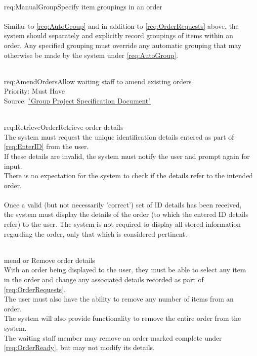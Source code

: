 \documentclass[11pt, a4paper]{report}
\def\itempar#1\\{\item \textbf{#1}\\} %
\begin{document}
\begin{enumerate}[label=F-UR-\arabic*, series=functional]
\begin{enumerate}[label*=.\arabic*]
\itempar \label{req:ManualGroup}Specify item groupings in an order\\
\underline{}\\
Similar to \autoref{req:AutoGroup} and in addition to \autoref{req:OrderRequests} above, the system should separately and explicitly record groupings of items within an order. Any specified grouping must override any automatic grouping that may otherwise be made by the system under \autoref{req:AutoGroup}.
\end{enumerate}


\itempar \label{req:AmendOrders}Allow waiting staff to amend existing orders\\
Priority: Must Have\\
Source: \href{http://www.macs.hw.ac.uk/~rpp6/teaching/GroupProject/docs/project/GroupProjectSpec2017.pdf}{"Group Project Specification Document"}
\begin{enumerate}[label*=.\arabic*]
\itempar \label{req:RetrieveOrder}Retrieve order details\\
The system must request the unique identification details entered as part of \autoref{req:EnterID} from the user.\\
If these details are invalid, the system must notify the user and prompt again for input.\\
There is no expectation for the system to check if the details refer to the intended order.\\
\\
Once a valid (but not necessarily 'correct') set of ID details has been received, the system must display the details of the order (to which the entered ID details refer) to the user. The system is not required to display all stored information regarding the order, only that which is considered pertinent.

\itempar Amend or Remove order details\\
With an order being displayed to the user, they must be able to select any item in the order and change any associated details recorded as part of \autoref{req:OrderRequests}.\\
The user must also have the ability to remove any number of items from an order.\\
The system will also provide functionality to remove the entire order from the system.\\
The waiting staff member may remove an order marked complete under \autoref{req:OrderReady}, but may not modify its details. 



\end{enumerate}
\end{enumerate}
\end{document}
